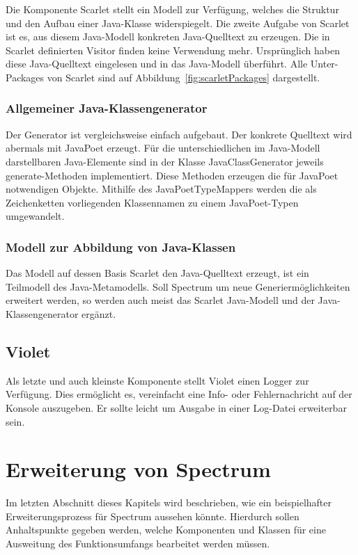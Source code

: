 \documentclass[12pt,oneside,a4paper,parskip]{scrbook}
\begin{document}
Die Komponente Scarlet stellt ein Modell zur Verfügung, welches die Struktur und den Aufbau einer Java-Klasse widerspiegelt. Die zweite Aufgabe von Scarlet ist es, aus diesem Java-Modell konkreten Java-Quelltext zu erzeugen. Die in Scarlet definierten Visitor finden keine Verwendung mehr. Ursprünglich haben diese Java-Quelltext eingelesen und in das Java-Modell überführt. Alle Unter-Packages von Scarlet sind auf Abbildung~\ref{fig:scarletPackages} dargestellt.

\subsubsection{Allgemeiner Java-Klassengenerator}

Der Generator ist vergleichsweise einfach aufgebaut. Der konkrete Quelltext wird abermals mit JavaPoet erzeugt. Für die unterschiedlichen im Java-Modell darstellbaren Java-Elemente sind in der Klasse JavaClassGenerator jeweils generate-Methoden implementiert. Diese Methoden erzeugen die für JavaPoet notwendigen Objekte. Mithilfe des JavaPoetTypeMappers werden die als Zeichenketten vorliegenden Klassennamen zu einem JavaPoet-Typen umgewandelt.

\subsubsection{Modell zur Abbildung von Java-Klassen}

Das Modell auf dessen Basis Scarlet den Java-Quelltext erzeugt, ist ein Teilmodell des Java-Metamodells. Soll Spectrum um neue Generiermöglichkeiten erweitert werden, so werden auch meist das Scarlet Java-Modell und der Java-Klassengenerator ergänzt.

\subsection{Violet}

Als letzte und auch kleinste Komponente stellt Violet einen Logger zur Verfügung. Dies ermöglicht es, vereinfacht eine Info- oder Fehlernachricht auf der Konsole auszugeben. Er sollte leicht um Ausgabe in einer Log-Datei erweiterbar sein.

\section{Erweiterung von Spectrum}

Im letzten Abschnitt dieses Kapitels wird beschrieben, wie ein beispielhafter Erweiterungsprozess für Spectrum aussehen könnte. Hierdurch sollen Anhaltspunkte gegeben werden, welche Komponenten und Klassen für eine Ausweitung des Funktionsumfangs bearbeitet werden müssen.
\end{document}
